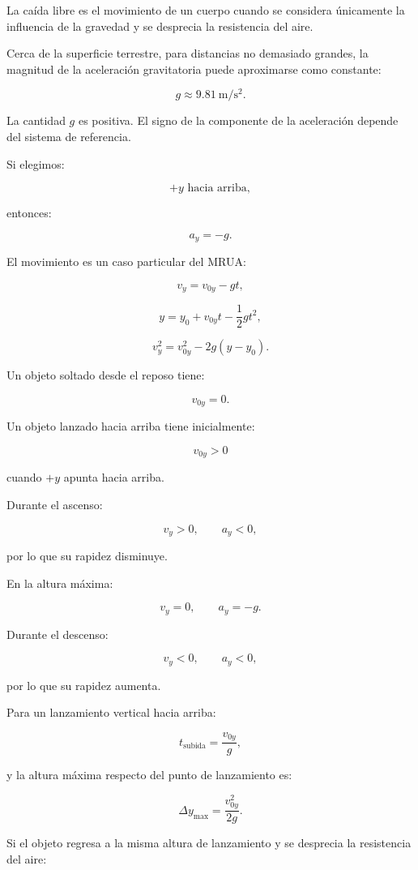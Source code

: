 \begin{resumen}
La caída libre es el movimiento de un cuerpo cuando se considera únicamente la influencia de la gravedad y se desprecia la resistencia del aire.

Cerca de la superficie terrestre, para distancias no demasiado grandes, la magnitud de la aceleración gravitatoria puede aproximarse como constante:

\[ g\approx\SI{9.81}{\meter\per\second\squared}. \]

La cantidad \(g\) es positiva. El signo de la componente de la aceleración depende del sistema de referencia.

Si elegimos:

\[ +y\text{ hacia arriba}, \]

entonces:

\[ \boxed{a_y=-g}. \]

El movimiento es un caso particular del MRUA:

\[ \boxed{v_y=v_{0y}-gt}, \]

\[ \boxed{y=y_0+v_{0y}t-\frac{1}{2}gt^2}, \]

\[ \boxed{v_y^2=v_{0y}^2-2g(y-y_0)}. \]

Un objeto soltado desde el reposo tiene:

\[ v_{0y}=0. \]

Un objeto lanzado hacia arriba tiene inicialmente:

\[ v_{0y}>0 \]

cuando \(+y\) apunta hacia arriba.

Durante el ascenso:

\[
v_y>0,
\qquad
a_y<0,
\]

por lo que su rapidez disminuye.

En la altura máxima:

\[
v_y=0,
\qquad
a_y=-g.
\]

Durante el descenso:

\[
v_y<0,
\qquad
a_y<0,
\]

por lo que su rapidez aumenta.

Para un lanzamiento vertical hacia arriba:

\[ \boxed{t_{\text{subida}}=\frac{v_{0y}}{g}}, \]

y la altura máxima respecto del punto de lanzamiento es:

\[ \boxed{\Delta y_{\max}=\frac{v_{0y}^2}{2g}}. \]

Si el objeto regresa a la misma altura de lanzamiento y se desprecia la resistencia del aire:


\end{resumen}
